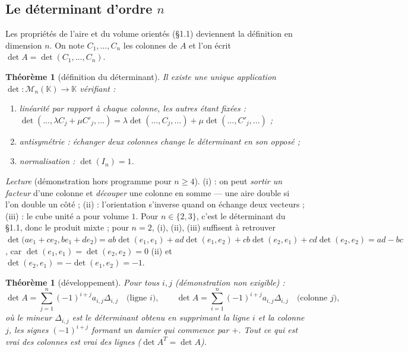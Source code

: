 \documentclass[a4paper,11pt]{article}
\numberwithin{equation}{section}
\numberwithin{figure}{section}
\numberwithin{table}{section}
\theoremstyle{enonce}
\newtheorem{theoreme}[definition]{Théorème}
\theoremstyle{exemple}
\theoremstyle{remarque}
\newcommand{\K}{\mathbb{K}}
\newcommand{\Mn}[1]{\mathcal{M}_{n}(#1)}
\begin{document}
\subsection{Le déterminant d'ordre $n$}


Les propriétés de l'aire et du volume orientés (§1.1) deviennent la définition en dimension $n$. On note
$C_1,\dots,C_n$ les colonnes de $A$ et l'on écrit $\det A=\det(C_1,\dots,C_n)$.

\begin{theoreme}[définition du déterminant]\label{thm:def}
Il existe une unique application $\det:\Mn{\K}\to\K$ vérifiant :
\begin{enumerate}
\item[(i)] \emph{linéarité par rapport à chaque colonne}, les autres étant fixées :
      $\det(\dots,\lambda C_j+\mu C'_j,\dots)=\lambda\det(\dots,C_j,\dots)+\mu\det(\dots,C'_j,\dots)$ ;
\item[(ii)] \emph{antisymétrie} : échanger deux colonnes change le déterminant en son opposé ;
\item[(iii)] \emph{normalisation} : $\det(I_n)=1$.
\end{enumerate}
\end{theoreme}

\emph{Lecture} (démonstration hors programme pour $n\geq4$). (i) : on peut \emph{sortir un facteur} d'une colonne et
\emph{découper} une colonne en somme --- une aire double si l'on double un côté ; (ii) : l'orientation s'inverse quand on
échange deux vecteurs ; (iii) : le cube unité a pour volume $1$. Pour $n\in\{2,3\}$, c'est le déterminant du §1.1, donc le
produit mixte ; pour $n=2$, (i), (ii), (iii) suffisent à retrouver
$\det\big(ae_1+ce_2,be_1+de_2\big)=ab\det(e_1,e_1)+ad\det(e_1,e_2)+cb\det(e_2,e_1)+cd\det(e_2,e_2)=ad-bc$, car $\det(e_1,e_1)=\det(e_2,e_2)=0$ (ii) et $\det(e_2,e_1)=-\det(e_1,e_2)=-1$.

\begin{theoreme}[développement]\label{thm:dev}
Pour tous $i,j$ (démonstration non exigible) :
\[\det A=\sum_{j=1}^n(-1)^{i+j}a_{i,j}\Delta_{i,j}\quad\text{(ligne $i$)},\qquad
\det A=\sum_{i=1}^n(-1)^{i+j}a_{i,j}\Delta_{i,j}\quad\text{(colonne $j$)},\]
où le \emph{mineur} $\Delta_{i,j}$ est le déterminant obtenu en supprimant la ligne $i$ et la colonne $j$, les signes
$(-1)^{i+j}$ formant un damier qui commence par $+$. Tout ce qui est vrai des colonnes est vrai des lignes
($\det A^T=\det A$).
\end{theoreme}
\end{document}
